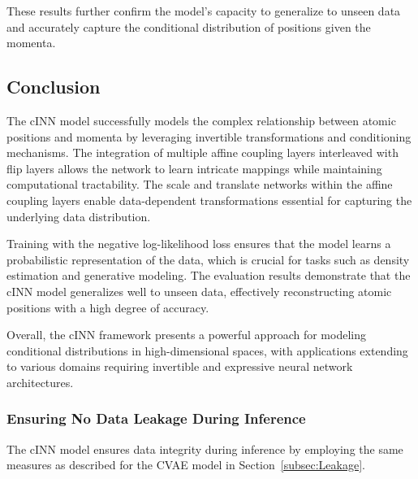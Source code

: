 \documentclass[11pt]{paper}
\begin{document}
These results further confirm the model's capacity to generalize to unseen data and accurately capture the conditional distribution of positions given the momenta.

\subsection{Conclusion}

The cINN model successfully models the complex relationship between atomic positions and momenta by leveraging invertible transformations and conditioning mechanisms. The integration of multiple affine coupling layers interleaved with flip layers allows the network to learn intricate mappings while maintaining computational tractability. The scale and translate networks within the affine coupling layers enable data-dependent transformations essential for capturing the underlying data distribution.

Training with the negative log-likelihood loss ensures that the model learns a probabilistic representation of the data, which is crucial for tasks such as density estimation and generative modeling. The evaluation results demonstrate that the cINN model generalizes well to unseen data, effectively reconstructing atomic positions with a high degree of accuracy.

Overall, the cINN framework presents a powerful approach for modeling conditional distributions in high-dimensional spaces, with applications extending to various domains requiring invertible and expressive neural network architectures.

\subsubsection{Ensuring No Data Leakage During Inference}

The cINN model ensures data integrity during inference by employing the same measures as described for the CVAE model in Section~\ref{subsec:Leakage}.
\end{document}
